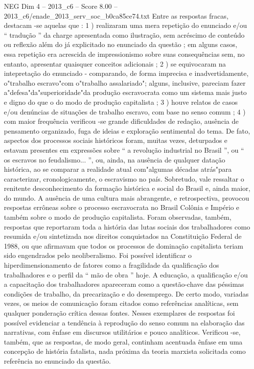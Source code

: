 \begin{textsample}{NEG Dim 4 – 2013\_c6 – Score 8.00 – 2013\_c6/enade\_2013\_serv\_soc\_b0ca85ce74.txt}
Entre as respostas fracas, destacam -se aquelas que : 1 ) realizaram uma mera repetição do enunciado e/ou “ tradução ” da charge apresentada como ilustração, sem acréscimo de conteúdo ou reflexão além do já explicitado no enunciado da questão ; em alguns casos, essa repetição era acrescida de impressionismo sobre suas consequências sem, no entanto, apresentar quaisquer conceitos adicionais ; 2 ) se equivocaram na intepretação do enunciado - comparando, de forma imprecisa e inadvertidamente, o"trabalho escravo"com o"trabalho assalariado"; alguns, inclusive, pareciam fazer a"defesa"da"superioridade"da produção escravocrata como um sistema mais justo e digno do que o do modo de produção capitalista ; 3 ) houve relatos de casos e/ou denúncias de situações de trabalho escravo, com base no senso comum ; 4 ) com maior frequência verificou -se grande dificuldades de redação, ausência de pensamento organizado, fuga de ideias e exploração sentimental do tema.
De fato, aspectos dos processos sociais históricos foram, muitas vezes, deturpados e estavam presentes em expressões sobre “ a revolução industrial no Brasil ”, ou “ os escravos no feudalismo... ”, ou, ainda, na ausência de qualquer datação histórica, ao se comparar a realidade atual com"algumas décadas atrás"para caracterizar, cronologicamente, o escravismo no país.
Sobretudo, vale ressaltar o renitente desconhecimento da formação histórica e social do Brasil e, ainda maior, do mundo.
A ausência de uma cultura mais abrangente, e retrospectiva, provocou respostas errôneas sobre o processo escravocrata no Brasil Colônia e Império e também sobre o modo de produção capitalista.
Foram observadas, também, respostas que reportaram toda a história das lutas sociais dos trabalhadores como resumida e/ou sintetizada nos direitos conquistados na Constituição Federal de 1988, ou que afirmavam que todos os processos de dominação capitalista teriam sido engendrados pelo neoliberalismo.
Foi possível identificar o hiperdimensionamento de fatores como a fragilidade da qualificação dos trabalhadores e o perfil da “ mão de obra ” hoje.
A educação, a qualificação e/ou a capacitação dos trabalhadores apareceram como a questão-chave das péssimas condições de trabalho, da precarização e do desemprego.
De certo modo, variadas vezes, os meios de comunicação foram citados como referências analíticas, sem qualquer ponderação crítica dessas fontes.
Nesses exemplares de respostas foi possível evidenciar a tendência à reprodução do senso comum na elaboração das narrativas, com ênfase em discursos utilitários e pouco analíticos.
Verificou -se, também, que as respostas, de modo geral, continham acentuada ênfase em uma concepção de história fatalista, nada próxima da teoria marxista solicitada como referência no enunciado da questão.

\end{textsample}
